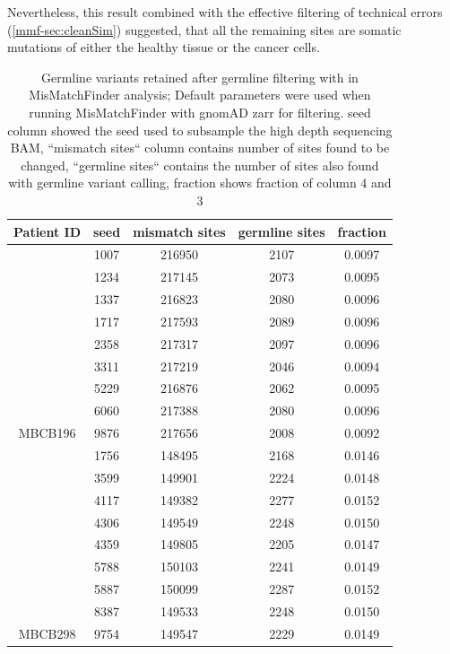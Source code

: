 Nevertheless, this result combined with the effective filtering of technical errors (\autoref{mmf-sec:cleanSim}) suggested, that all the remaining sites are somatic mutations of either the healthy tissue or the cancer cells.

\begin{table}
\caption[Germline variants retained after germline filtering]{Germline variants retained after germline filtering with in MisMatchFinder analysis; Default parameters were used when running MisMatchFinder with gnomAD zarr for filtering. seed column showed the seed used to subsample the high depth sequencing BAM, ``mismatch sites`` column contains number of sites found to be changed, ``germline sites`` contains the number of sites also found with germline variant calling, fraction shows fraction of column 4 and 3}\label{tab:mmf-germlineArtifacts}
\centering
\begin{tabular}{|c|c|c|c|c|}
\toprule
\hline
\textbf{Patient ID} & \textbf{seed} & \textbf{mismatch sites} & \textbf{germline sites} & \textbf{fraction} \\
\hline
 & \num{1007} & \num{216950} &  \num{2107} & \num{0.0097}\\ 
 & \num{1234} & \num{217145} &  \num{2073} & \num{0.0095}\\ 
 & \num{1337} & \num{216823} &  \num{2080} & \num{0.0096}\\ 
 & \num{1717} & \num{217593} &  \num{2089} & \num{0.0096}\\ 
 & \num{2358} & \num{217317} &  \num{2097} & \num{0.0096}\\ 
 & \num{3311} & \num{217219} &  \num{2046} & \num{0.0094}\\ 
 & \num{5229} & \num{216876} &  \num{2062} & \num{0.0095}\\ 
 & \num{6060} & \num{217388} &  \num{2080} & \num{0.0096}\\ 
\multirow{-9}{*}{MBCB196} & \num{9876} & \num{217656} &  \num{2008} & \num{0.0092}\\ 
\hline
 & \num{1756} & \num{148495} &  \num{2168} & \num{0.0146}\\ 
 & \num{3599} & \num{149901} &  \num{2224} & \num{0.0148}\\ 
 & \num{4117} & \num{149382} &  \num{2277} & \num{0.0152}\\ 
 & \num{4306} & \num{149549} &  \num{2248} & \num{0.0150}\\ 
 & \num{4359} & \num{149805} &  \num{2205} & \num{0.0147}\\ 
 & \num{5788} & \num{150103} &  \num{2241} & \num{0.0149}\\ 
 & \num{5887} & \num{150099} &  \num{2287} & \num{0.0152}\\ 
 & \num{8387} & \num{149533} &  \num{2248} & \num{0.0150}\\ 
\multirow{-9}{*}{MBCB298} & \num{9754} & \num{149547} &  \num{2229} & \num{0.0149}\\
\hline
\bottomrule
\end{tabular}
\end{table}


